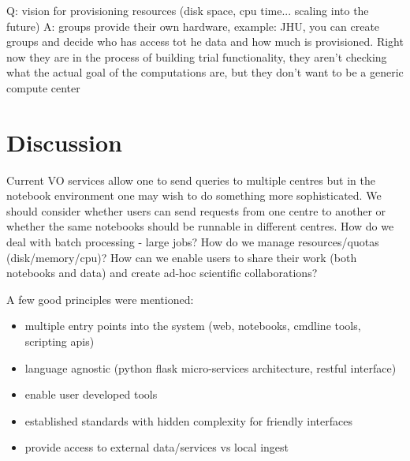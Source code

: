 \documentclass[11pt,twoside]{article}
\begin{document}

Q: vision for provisioning resources (disk space, cpu time... scaling into the future)
A: groups provide their own hardware, example: JHU, you can create groups and decide who has access tot he data and how much is provisioned. Right now they are in the process of building trial functionality, they aren't checking what the actual goal of the computations are, but they don't want to be a generic compute center

\section{Discussion}
Current VO services allow one to send queries to multiple centres but in the notebook environment one may wish to do something more sophisticated. We should consider whether users can send requests from one centre to another or whether the same notebooks should be runnable in different centres.
How do we deal with batch processing - large jobs? How do we manage resources/quotas (disk/memory/cpu)?  How can we enable users to share their work (both notebooks and data) and create ad-hoc scientific collaborations?


A few good principles were mentioned:
\begin{itemize}
\item multiple entry points into the system (web, notebooks, cmdline tools, scripting apis)
\item language agnostic (python flask micro-services architecture, restful interface)
\item  enable user developed tools
\item  established standards with hidden complexity for friendly interfaces
\item  provide access to external data/services vs local ingest

\end{itemize}
\end{document}
